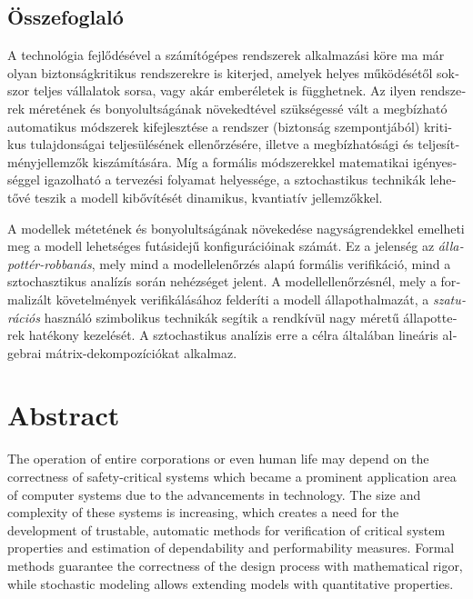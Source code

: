 \begin{otherlanguage}{magyar}

  \chapter{Összefoglaló}

  A technológia fejlődésével a számítógépes rendszerek alkalmazási
  köre ma már olyan biztonságkritikus rendszerekre is kiterjed,
  amelyek helyes működésétől sokszor teljes vállalatok sorsa, vagy
  akár emberéletek is függhetnek. Az ilyen rendszerek méretének és
  bonyolultságának növekedtével szükségessé vált a megbízható
  automatikus módszerek kifejlesztése a rendszer (biztonság
  szempontjából) kritikus tulajdonságai teljesülésének ellenőrzésére,
  illetve a megbízhatósági és teljesítményjellemzők kiszámítására. Míg
  a formális módszerekkel matematikai igényességgel igazolható a
  tervezési folyamat helyessége, a sztochastikus technikák lehetővé
  teszik a modell kibővítését dinamikus, kvantiatív jellemzőkkel.

  A modellek métetének és bonyolultságának növekedése nagyságrendekkel
  emelheti meg a modell lehetséges futásidejű konfigurációinak
  számát. Ez a jelenség az \emph{állapottér-robbanás}, mely mind a
  modellelenőrzés alapú formális verifikáció, mind a sztochasztikus
  analízís során nehézséget jelent. A modellellenőrzésnél, mely a
  formalizált követelmények verifikálásához felderíti a modell
  állapothalmazát, a \emph{szaturációs} használó szimbolikus technikák
  segítik a rendkívül nagy méretű állapotterek hatékony kezelését. A
  sztochastikus analízis erre a célra általában lineáris algebrai
  mátrix-dekompozíciókat alkalmaz.

\end{otherlanguage}

\chapter{Abstract}

The operation of entire corporations or even human life may depend on
the correctness of safety-critical systems which became a prominent
application area of computer systems due to the advancements in
technology. The size and complexity of these systems is increasing,
which creates a need for the development of trustable, automatic methods
for verification of critical system properties and estimation of
dependability and performability measures. Formal methods guarantee
the correctness of the design process with mathematical rigor, while
stochastic modeling allows extending models with quantitative
properties.

